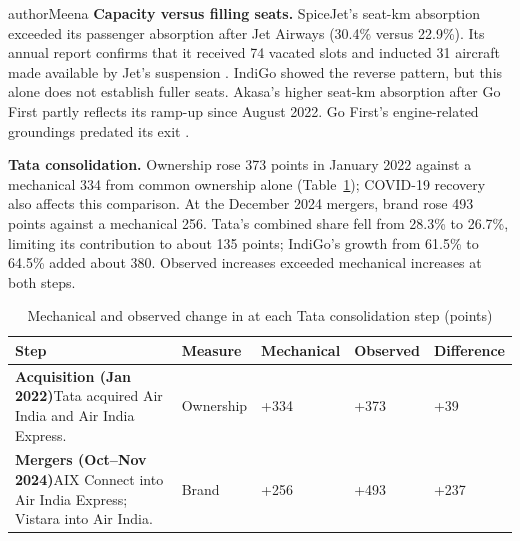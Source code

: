 \begin{mergedcontribution}{authorMeena}
\textbf{Capacity versus filling seats.} SpiceJet's seat-km absorption exceeded its passenger absorption after Jet Airways (30.4\% versus 22.9\%). Its annual report confirms that it received 74 vacated slots and inducted 31 aircraft made available by Jet's suspension \parencite[p.~62]{spicejet2020annual}. IndiGo showed the reverse pattern, but this alone does not establish fuller seats. Akasa's higher seat-km absorption after Go First partly reflects its ramp-up since August 2022. Go First's engine-related groundings predated its exit \parencite[p.~35]{goair2021drhp}.

\textbf{Tata consolidation.} Ownership \HHI{} rose 373 points in January 2022 against a mechanical 334 from common ownership alone (Table~\ref{tab:o2-mech}); COVID-19 recovery also affects this comparison. At the December 2024 mergers, brand \HHI{} rose 493 points against a mechanical 256. Tata's combined share fell from 28.3\% to 26.7\%, limiting its contribution to about 135 points; IndiGo's growth from 61.5\% to 64.5\% added about 380. Observed increases exceeded mechanical increases at both steps.

\begin{table}[H]
\centering
\color{authorMeena}
\caption{Mechanical and observed change in \HHI{} at each Tata consolidation step (points)}\label{tab:o2-mech}
\small
\fontsize{10}{12}\selectfont{}\setlength{\tabcolsep}{3pt}
\renewcommand{\arraystretch}{1.15}
\begin{tabular}{|>{\raggedright\arraybackslash}p{}|>{\raggedright\arraybackslash}p{}|>{\raggedright\arraybackslash}p{}|>{\raggedright\arraybackslash}p{}|>{\raggedright\arraybackslash}p{}|}
\hline
\textbf{Step} & \textbf{Measure} & \textbf{Mechanical} & \textbf{Observed} & \textbf{Difference} \\
\hline
\raggedright\textbf{Acquisition (Jan 2022)}\newline Tata acquired Air India and Air India Express. & Ownership \HHI{} & +334 & +373 & +39 \\
\hline
\raggedright\textbf{Mergers (Oct--Nov 2024)}\newline AIX Connect into Air India Express; Vistara into Air India. & Brand \HHI{} & +256 & +493 & +237 \\
\hline
\end{tabular}
\end{table}


\end{mergedcontribution}
